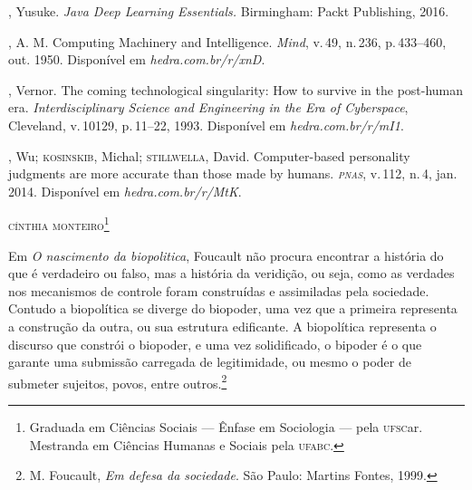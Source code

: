 \begin{bibliohedra}
, Yusuke. \textit{Java Deep Learning Essentials.} Birmingham: Packt
Publishing, 2016.

, A. M. Computing Machinery and Intelligence. \textit{Mind}, v.\,49, n.\,236, p.\,433--460, out. 1950. Disponível em \textit{hedra.com.br/r/xnD}.

, Vernor. The coming technological singularity: How to
survive in the post-human era. \textit{Interdisciplinary Science and
Engineering in the Era of Cyberspace}, Cleveland, v.\,10129, p.\,11--22,
1993. Disponível em \textit{hedra.com.br/r/mI1}.

, Wu; \textsc{kosinskib}, Michal; \textsc{stillwella}, David.
Computer-based personality judgments are more accurate than
those made by humans. \textit{\textsc{pnas}}, v.\,112, n.\,4, jan. 2014. Disponível em \textit{hedra.com.br/r/MtK}.
\end{bibliohedra}




\begin{flushright}
\textsc{cínthia monteiro\footnote{Graduada em Ciências Sociais --- Ênfase em Sociologia --- pela \textsc{ufsc}ar. Mestranda em Ciências Humanas e Sociais pela \textsc{ufabc}.}}
\end{flushright}

\noindent{}Em \textit{O nascimento da biopolitica}, Foucault não procura
encontrar a história do que é verdadeiro ou falso, mas a história da
veridição, ou seja, como as verdades nos mecanismos de controle foram
construídas e assimiladas pela sociedade. Contudo a biopolítica se
diverge do biopoder, uma vez que a primeira representa a construção da
outra, ou sua estrutura edificante. A biopolítica representa o discurso
que constrói o biopoder, e uma vez solidificado, o bipoder é o que
garante uma submissão carregada de legitimidade, ou mesmo o poder de
submeter sujeitos, povos, entre outros.\footnote{M. Foucault, \textit{Em defesa da sociedade}. São Paulo: Martins Fontes, 1999.}

